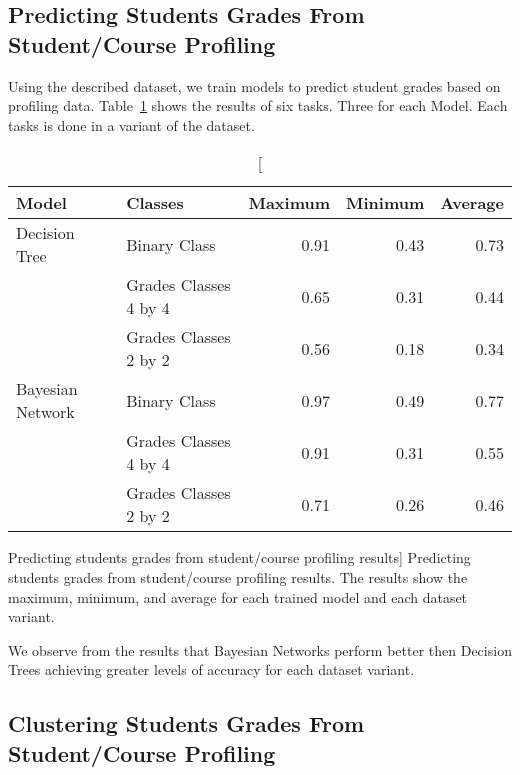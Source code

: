 \subsection{Predicting Students Grades From Student/Course Profiling}

Using the described dataset, we train models to predict student grades based on
profiling data. Table~\ref{tab:exp_005_res} shows the results of six tasks.
Three for each Model. Each tasks is done in a variant of the dataset.

\begin{table}[h!]
    \centering

    \begin{tabular}{| l | l | r | r | r |}
        \hline
        \textbf{Model} & \textbf{Classes} & \textbf{Maximum} & \textbf{Minimum} & \textbf{Average} \\ \hline
        Decision Tree    & Binary Class          & 0.91 & 0.43 & 0.73 \\
                         & Grades Classes 4 by 4 & 0.65 & 0.31 & 0.44 \\
                         & Grades Classes 2 by 2 & 0.56 & 0.18 & 0.34 \\ \hline
        Bayesian Network & Binary Class          & 0.97 & 0.49 & 0.77 \\
                         & Grades Classes 4 by 4 & 0.91 & 0.31 & 0.55 \\
                         & Grades Classes 2 by 2 & 0.71 & 0.26 & 0.46 \\ \hline
    \end{tabular}

    \caption
        [Predicting students grades from student/course profiling results]
        {Predicting students grades from student/course profiling results. The
        results show the maximum, minimum, and average for each trained model
        and each dataset variant.}

    \label{tab:exp_005_res}
\end{table}

We observe from the results that Bayesian Networks perform better then Decision
Trees achieving greater levels of accuracy for each dataset variant.

\subsection{Clustering Students Grades From Student/Course Profiling}

